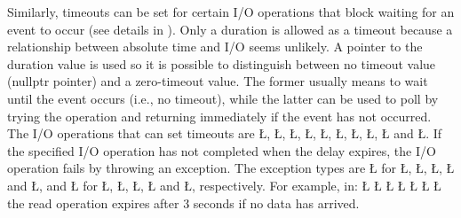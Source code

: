 \documentclass[openright,twoside]{report}
\begin{document}
Similarly, timeouts can be set for certain I/O operations that block waiting for an event to occur (see details in ).
Only a duration is allowed as a timeout because a relationship between absolute time and I/O seems unlikely.
A pointer to the duration value is used so it is possible to distinguish between no timeout value (nullptr pointer) and a zero-timeout value.
The former usually means to wait until the event occurs (i.e., no timeout), while the latter can be used to poll by trying the operation and returning immediately if the event has not occurred.
The I/O operations that can set timeouts are \LGinlinetrue\LGbegin\lgrinde\L{}\endlgrinde\LGend{}, \LGinlinetrue\LGbegin\lgrinde\L{}\endlgrinde\LGend{}, \LGinlinetrue\LGbegin\lgrinde\L{}\endlgrinde\LGend{}, \LGinlinetrue\LGbegin\lgrinde\L{}\endlgrinde\LGend{}, \LGinlinetrue\LGbegin\lgrinde\L{}\endlgrinde\LGend{}, \LGinlinetrue\LGbegin\lgrinde\L{}\endlgrinde\LGend{}, \LGinlinetrue\LGbegin\lgrinde\L{}\endlgrinde\LGend{}, \LGinlinetrue\LGbegin\lgrinde\L{}\endlgrinde\LGend{}, \LGinlinetrue\LGbegin\lgrinde\L{}\endlgrinde\LGend{} and \LGinlinetrue\LGbegin\lgrinde\L{}\endlgrinde\LGend{}.
If the specified I/O operation has not completed when the delay expires, the I/O operation fails by throwing an exception.
The exception types are \LGinlinetrue\LGbegin\lgrinde\L{}\endlgrinde\LGend{} for \LGinlinetrue\LGbegin\lgrinde\L{}\endlgrinde\LGend{}, \LGinlinetrue\LGbegin\lgrinde\L{}\endlgrinde\LGend{}, \LGinlinetrue\LGbegin\lgrinde\L{}\endlgrinde\LGend{}, \LGinlinetrue\LGbegin\lgrinde\L{}\endlgrinde\LGend{} and \LGinlinetrue\LGbegin\lgrinde\L{}\endlgrinde\LGend{}, and \LGinlinetrue\LGbegin\lgrinde\L{}\endlgrinde\LGend{} for \LGinlinetrue\LGbegin\lgrinde\L{}\endlgrinde\LGend{}, \LGinlinetrue\LGbegin\lgrinde\L{}\endlgrinde\LGend{}, \LGinlinetrue\LGbegin\lgrinde\L{}\endlgrinde\LGend{}, \LGinlinetrue\LGbegin\lgrinde\L{}\endlgrinde\LGend{} and \LGinlinetrue\LGbegin\lgrinde\L{}\endlgrinde\LGend{}, respectively.
For example, in:
\LGinlinefalse\LGbegin\lgrinde
\L{}
\L{\LB{}}
\CE{}\L{\LB{}}
\L{\LB{}}
\CE{}\L{}
\L{\LB{}}
\CE{}\L{\LB{\}}}
\endlgrinde\LGend
the read operation expires after 3 seconds if no data has arrived.
\end{document}

